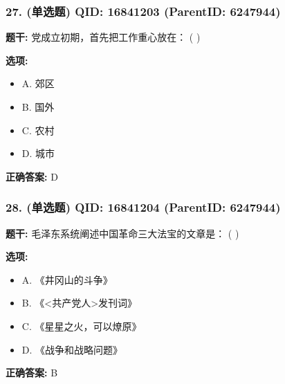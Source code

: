 \documentclass[12pt,UTF8]{ctexart}
\begin{document}
\vspace{0.3em}\hrulefill\vspace{0.7em}

\subsubsection*{27. (单选题) \small QID: 16841203 (ParentID: 6247944)}

\textbf{题干:}
党成立初期，首先把工作重心放在： ( )



\textbf{选项:}
\begin{itemize}[leftmargin=*]

  \item A. 郊区

  \item B. 国外

  \item C. 农村

  \item D. 城市

\end{itemize}

\textbf{正确答案:}
D

\vspace{0.3em}\hrulefill\vspace{0.7em}

\subsubsection*{28. (单选题) \small QID: 16841204 (ParentID: 6247944)}

\textbf{题干:}
毛泽东系统阐述中国革命三大法宝的文章是： ( )



\textbf{选项:}
\begin{itemize}[leftmargin=*]

  \item A. 《井冈山的斗争》

  \item B. 《<共产党人>发刊词》

  \item C. 《星星之火，可以燎原》

  \item D. 《战争和战略问题》

\end{itemize}

\textbf{正确答案:}
B

\vspace{0.3em}\hrulefill\vspace{0.7em}
\end{document}
